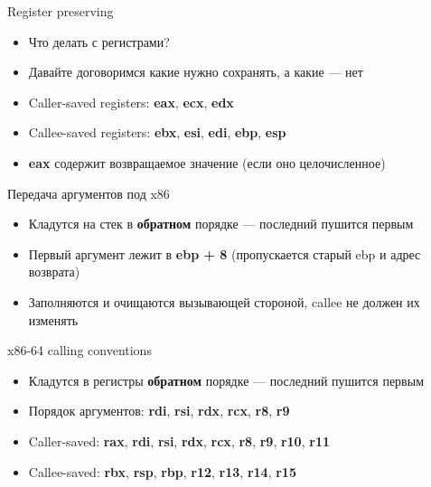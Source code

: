 \documentclass[10pt,pdf,hyperref={unicode}]{beamer}
\begin{document}
\begin{frame}{Register preserving}
\begin{itemize}
    \item Что делать с регистрами?
    \item Давайте договоримся какие нужно сохранять, а какие — нет
    \item Caller-saved registers: \textbf{eax}, \textbf{ecx}, \textbf{edx}
    \item Callee-saved registers: \textbf{ebx}, \textbf{esi}, \textbf{edi}, \textbf{ebp}, \textbf{esp}
    \item \textbf{eax} содержит возвращаемое значение (если оно целочисленное)
\end{itemize}
\end{frame}

\begin{frame}{Передача аргументов под x86}
\begin{itemize}
    \item Кладутся на стек в \textbf{обратном} порядке — последний пушится первым
    \item Первый аргумент лежит в \textbf{ebp + 8} (пропускается старый ebp и адрес возврата)
    \item Заполняются и очищаются вызывающей стороной, callee не должен их изменять
\end{itemize}
\end{frame}

\begin{frame}{x86-64 calling conventions}
\begin{itemize}
    \item Кладутся в регистры \textbf{обратном} порядке — последний пушится первым
    \item Порядок аргументов: \textbf{rdi}, \textbf{rsi}, \textbf{rdx}, \textbf{rcx}, \textbf{r8}, \textbf{r9}
    \item Caller-saved: \textbf{rax}, \textbf{rdi}, \textbf{rsi}, \textbf{rdx}, \textbf{rcx}, \textbf{r8}, \textbf{r9}, \textbf{r10}, \textbf{r11}
    \item Callee-saved: \textbf{rbx}, \textbf{rsp}, \textbf{rbp}, \textbf{r12}, \textbf{r13}, \textbf{r14}, \textbf{r15}
\end{itemize}
\end{frame}
\end{document}
